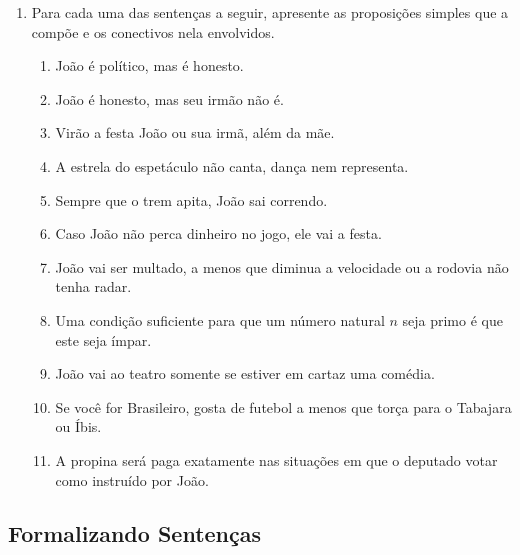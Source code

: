 \begin{enumerate}
  \item Para cada uma das senten\c{c}as a seguir, apresente as proposi\c{c}\~oes simples que a comp\~oe e os conectivos nela envolvidos.
  \begin{enumerate}
     \item Jo\~ao \'e pol\'itico, mas \'e honesto.
     \item Jo\~ao \'e honesto, mas seu irm\~ao n\~ao \'e.
     \item Vir\~ao a festa Jo\~ao ou sua irm\~a, al\'em da m\~ae.
     \item A estrela do espet\'aculo n\~ao canta, dan\c{c}a nem representa.
     \item Sempre que o trem apita, Jo\~ao sai correndo.
     \item Caso Jo\~ao n\~ao perca dinheiro no jogo, ele vai a festa.
     \item Jo\~ao vai ser multado, a menos que diminua a velocidade ou a rodovia n\~ao tenha radar.
     \item Uma condi\c{c}\~ao suficiente para que um n\'umero natural $n$ seja primo \'e que este seja \'impar.
     \item Jo\~ao vai ao teatro somente se estiver em cartaz uma com\'edia.
     \item Se voc\^e for Brasileiro, gosta de futebol a menos que tor\c{c}a para o Tabajara ou \'Ibis.
     \item A propina ser\'a paga exatamente nas situa\c{c}\~oes em que o deputado votar como instru\'ido por Jo\~ao.
 \end{enumerate}
\end{enumerate}

\subsection{Formalizando Senten\c{c}as}

